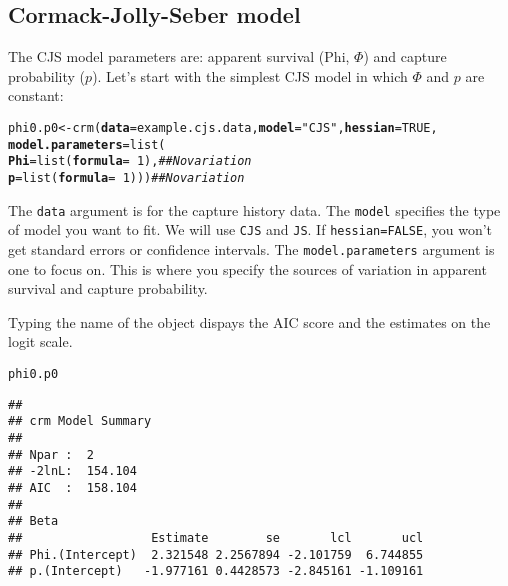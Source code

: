 \documentclass[12pt]{article}\usepackage[]{graphicx}\usepackage[]{xcolor}
\makeatletter
\newcommand{\hlnum}[1]{\textcolor[rgb]{0.69,0.494,0}{#1}}%
\newcommand{\hlsng}[1]{\textcolor[rgb]{0.749,0.012,0.012}{#1}}%
\newcommand{\hlcom}[1]{\textcolor[rgb]{0.514,0.506,0.514}{\textit{#1}}}%
\newcommand{\hlopt}[1]{\textcolor[rgb]{0,0,0}{#1}}%
\newcommand{\hldef}[1]{\textcolor[rgb]{0,0,0}{#1}}%
\newcommand{\hlkwb}[1]{\textcolor[rgb]{0,0.341,0.682}{#1}}%
\newcommand{\hlkwc}[1]{\textcolor[rgb]{0,0,0}{\textbf{#1}}}%
\newcommand{\hlkwd}[1]{\textcolor[rgb]{0.004,0.004,0.506}{#1}}%
\newenvironment{kframe}{%
 \def\at@end@of@kframe{}%
 \ifinner\ifhmode%
  \def\at@end@of@kframe{\end{minipage}}%
  \begin{minipage}{\columnwidth}%
 \fi\fi%
 \def\FrameCommand##1{\hskip\@totalleftmargin \hskip-\fboxsep
 \colorbox{shadecolor}{##1}\hskip-\fboxsep
     \hskip-\linewidth \hskip-\@totalleftmargin \hskip\columnwidth}%
 \MakeFramed {\advance\hsize-\width
   \@totalleftmargin\z@ \linewidth\hsize
   \@setminipage}}%
 {\par\unskip\endMakeFramed%
 \at@end@of@kframe}
\newenvironment{knitrout}{}{} %
\newcommand{\inr}[1]{\colorbox{inlinecolor}{\texttt{#1}}}
\makeatother
\begin{document}
\subsection*{Cormack-Jolly-Seber model}

The CJS model parameters are: apparent survival (Phi, $\Phi$) and capture
probability ($p$). Let's start with the simplest CJS model in which
$\Phi$ and $p$ are constant: 


\begin{knitrout}
\color{fgcolor}\begin{kframe}
\begin{alltt}
\hldef{phi0.p0} \hlkwb{<-} \hlkwd{crm}\hldef{(}\hlkwc{data}\hldef{=example.cjs.data,} \hlkwc{model}\hldef{=}\hlsng{"CJS"}\hldef{,} \hlkwc{hessian}\hldef{=}\hlnum{TRUE}\hldef{,}
               \hlkwc{model.parameters}\hldef{=}\hlkwd{list}\hldef{(}
                   \hlkwc{Phi}\hldef{=}\hlkwd{list}\hldef{(}\hlkwc{formula}\hldef{=}\hlopt{~}\hlnum{1}\hldef{),}  \hlcom{## No variation}
                   \hlkwc{p}\hldef{=}\hlkwd{list}\hldef{(}\hlkwc{formula}\hldef{=}\hlopt{~}\hlnum{1}\hldef{)))}   \hlcom{## No variation}
\end{alltt}
\end{kframe}
\end{knitrout}

The \inr{data} argument is for the capture history data. The
\inr{model} specifies the type of model you want to fit. We will use
\texttt{CJS} and \texttt{JS}. If \inr{hessian=FALSE}, you won't get
standard errors or confidence intervals. The \inr{model.parameters}
argument is one to focus on. This is where you specify the sources of
variation in apparent survival and capture probability. 


\clearpage

Typing the name of the object dispays the AIC score and
the estimates on the logit scale.  

\begin{knitrout}\small
{}\color{fgcolor}\begin{kframe}
\begin{alltt}
\hldef{phi0.p0}
\end{alltt}
\begin{verbatim}
## 
## crm Model Summary
## 
## Npar :  2
## -2lnL:  154.104
## AIC  :  158.104
## 
## Beta
##                  Estimate        se       lcl       ucl
## Phi.(Intercept)  2.321548 2.2567894 -2.101759  6.744855
## p.(Intercept)   -1.977161 0.4428573 -2.845161 -1.109161
\end{verbatim}
\end{kframe}
\end{knitrout}
\end{document}
